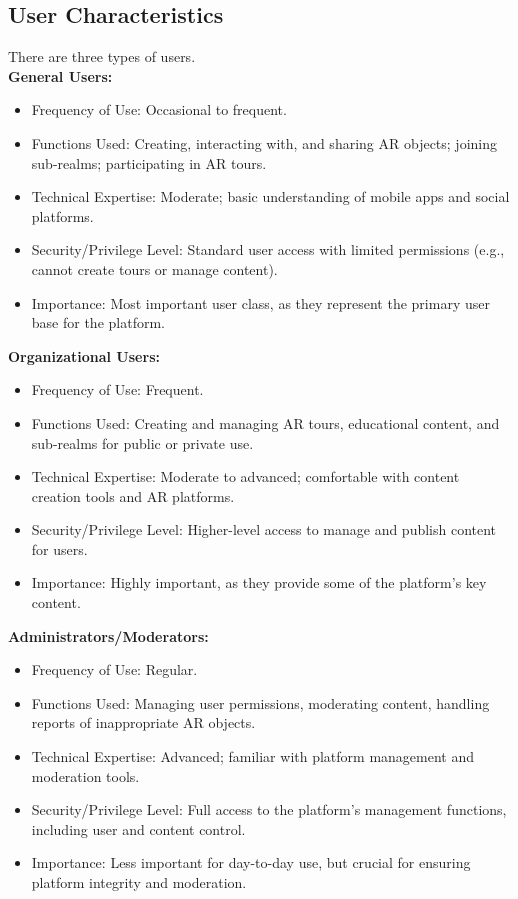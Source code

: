 \documentclass{article}
\begin{document}
\subsection{User Characteristics}

There are three types of users.\\

\textbf{General Users:}
\begin{itemize}
    \item Frequency of Use: Occasional to frequent.
    \item Functions Used: Creating, interacting with, and sharing AR objects; joining sub-realms; participating in AR tours.
    \item Technical Expertise: Moderate; basic understanding of mobile apps and social platforms.
    \item Security/Privilege Level: Standard user access with limited permissions (e.g., cannot create tours or manage content).
    \item Importance: Most important user class, as they represent the primary user base for the platform.
\end{itemize}

\textbf{Organizational Users:}
\begin{itemize}
    \item Frequency of Use: Frequent.
    \item Functions Used: Creating and managing AR tours, educational content, and sub-realms for public or private use.
    \item Technical Expertise: Moderate to advanced; comfortable with content creation tools and AR platforms.
    \item Security/Privilege Level: Higher-level access to manage and publish content for users.
    \item Importance: Highly important, as they provide some of the platform’s key content.
\end{itemize}

\textbf{Administrators/Moderators:}
\begin{itemize}
    \item Frequency of Use: Regular.
    \item Functions Used: Managing user permissions, moderating content, handling reports of inappropriate AR objects.
    \item Technical Expertise: Advanced; familiar with platform management and moderation tools.
    \item Security/Privilege Level: Full access to the platform's management functions, including user and content control.
    \item Importance: Less important for day-to-day use, but crucial for ensuring platform integrity and moderation.
\end{itemize}
\end{document}
